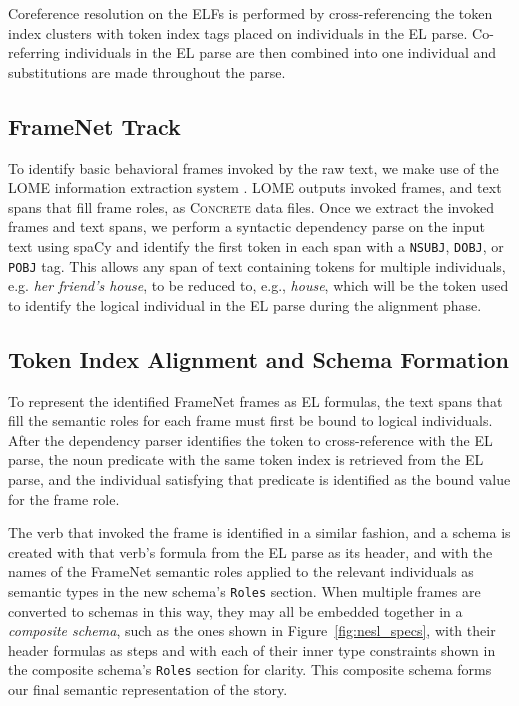Coreference resolution on the ELFs is performed by cross-referencing the token index clusters with token index tags placed on individuals in the EL parse. Co-referring individuals in the EL parse are then combined into one individual and substitutions are made throughout the parse.

\subsection{FrameNet Track}
To identify basic behavioral frames invoked by the raw text, we make use of the LOME information extraction system \citep{lome}. LOME outputs invoked frames, and text spans that fill frame roles, as \textsc{Concrete} data files. Once we extract the invoked frames and text spans, we perform a syntactic dependency parse on the input text using spaCy \citep{spacy2} and identify the first token in each span with a \texttt{NSUBJ}, \texttt{DOBJ}, or \texttt{POBJ} tag. This allows any span of text containing tokens for multiple individuals, e.g. \textit{her friend's house}, to be reduced to, e.g., \textit{house}, which will be the token used to identify the logical individual in the EL parse during the alignment phase.

\subsection{Token Index Alignment and Schema Formation}
To represent the identified FrameNet frames as EL formulas, the text spans that fill the semantic roles for each frame must first be bound to logical individuals. After the dependency parser identifies the token to cross-reference with the EL parse, the noun predicate with the same token index is retrieved from the EL parse, and the individual satisfying that predicate is identified as the bound value for the frame role.

The verb that invoked the frame is identified in a similar fashion, and a schema is created with that verb's formula from the EL parse as its header, and with the names of the FrameNet semantic roles applied to the relevant individuals as semantic types in the new schema's \texttt{Roles} section. When multiple frames are converted to schemas in this way, they may all be embedded together in a \textit{composite schema}, such as the ones shown in Figure~\ref{fig:nesl_specs}, with their header formulas as steps and with each of their inner type constraints shown in the composite schema's \texttt{Roles} section for clarity. This composite schema forms our final semantic representation of the story.

